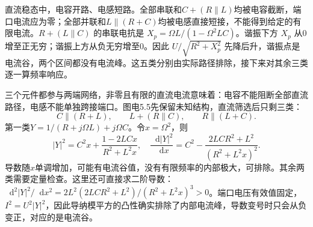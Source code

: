 \documentclass[UTF8,fontset=fandol,a4paper,11pt]{ctexart}
\newcommand{\dd}{\mathop{}\!\mathrm{d}}
\begin{document}
直流稳态中，电容开路、电感短路。全部串联和$C+(R\parallel L)$均被电容截断，端口电流应为零；全部并联和$L\parallel(R+C)$均被电感直接短接，不能得到给定的有限电流。$R+(L\parallel C)$ 的串联电抗是 $X_p=\Omega L/(1-\Omega^2LC)$。谐振下方 $X_p$ 从0增至正无穷；谐振上方从负无穷增至0。因此 $U/\sqrt{R^2+X_p^2}$ 先降后升，谐振点是电流谷，两个区间都没有电流峰。这五类分别由实际路径排除，接下来对其余三类逐一算频率响应。

三个元件都参与两端网络，非零且有限的直流电流意味着：电容不能阻断全部直流路径，电感不能单独跨接端口。图电5.5先保留未知结构，直流筛选后只剩三类：
\[
 C\parallel(R+L),\qquad L+(R\parallel C),\qquad R\parallel(L+C).
\]
第一类$Y=1/(R+j\Omega L)+j\Omega C$。令$x=\Omega^2$，则
\[
 |Y|^2=C^2x+\frac{1-2LCx}{R^2+L^2x},\quad
 \frac{\dd|Y|^2}{\dd x}
 =C^2-\frac{2LCR^2+L^2}{(R^2+L^2x)^2}.
\]
导数随$x$单调增加，可能有电流谷值，没有有限频率的内部极大，可排除。其余两类需要定量检查。这里还可直接求二阶导数：$\dd^2|Y|^2/\dd x^2=2L^2(2LCR^2+L^2)/(R^2+L^2x)^3>0$。端口电压有效值固定，$I^2=U^2|Y|^2$，因此导纳模平方的凸性确实排除了内部电流峰，导数变号时只会从负变正，对应的是电流谷。
\end{document}
